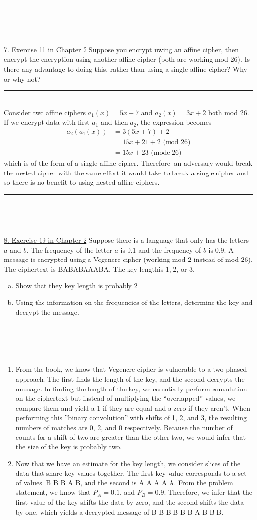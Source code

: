 \documentclass{article}
\newcommand{\problemsep}{\leavevmode\\[0.05in] \rule[\baselineskip/4]{\textwidth}{1pt} \\[0.005in] \rule[\baselineskip]{\textwidth}{1pt}\vspace{-\baselineskip}\leavevmode\\[0.05in]}
\newcommand{\statementsep}{\leavevmode\\[0.005in] \rule[\baselineskip/4]{\textwidth}{0.4pt}\leavevmode\\[0.005in]}
\begin{document}
\problemsep
\noindent\underline{7. Exercise 11 in Chapter 2}
Suppose you encrypt uwing an affine cipher, then encrypt the encryption using another affine cipher (both are working mod 26). Is there any advantage to doing this, rather than using a single affine cipher? Why or why not?
\statementsep
Consider two affine ciphers $a_1(x) = 5x + 7$ and $a_2(x) = 3x + 2$ both mod 26. If we encrypt data with first $a_1$ and then $a_2$, the expression becomes
\begin{equation*}\begin{aligned}
a_2(a_1(x)) & = 3(5x + 7) + 2  \\
            & = 15x + 21 + 2 \text{ (mod 26)} \\
            & = 15x + 23 \text{ (mode 26)}
\end{aligned}\end{equation*}
which is of the form of a single affine cipher. Therefore, an adversary would break the nested cipher with the same effort it would take to break a single cipher and so there is no benefit to using nested affine ciphers.
\problemsep
\noindent\underline{8. Exercise 19 in Chapter 2}
Suppose there is a language that only has the letters $a$ and $b$. The frequency of the letter $a$ is 0.1 and the frequency of $b$ is 0.9. A message is encrypted using a Vegenere cipher (working mod 2 instead of mod 26). The ciphertext is BABABAAABA. The key lengthis 1, 2, or 3.
\begin{enumerate}[(a)]
	\item Show that they key length is probably 2
	\item Using the information on the frequencies of the letters, determine the key and decrypt the message.
\end{enumerate}
\statementsep
\begin{enumerate}
	\item From the book, we know that Vegenere cipher is vulnerable to a two-phased approach. The first finds the length of the key, and the second decrypts the message. In finding the length of the key, we essentially perform convolution on the ciphertext but instead of multiplying the ``overlapped'' values, we compare them and yield a 1 if they are equal and a zero if they aren't. When performing this ''binary convolution'' with shifts of 1, 2, and 3, the resulting numbers of matches are 0, 2, and 0 respectively. Because the number of counts for a shift of two are greater than the other two, we would infer that the size of the key is probably two.
	\item Now that we have an estimate for the key length, we consider slices of the data that share key values together. The first key value corresponds to a set of values: B B B A B, and the second is A A A A A. From the problem statement, we know that $P_A = 0.1$, and $P_B = 0.9$. Therefore, we infer that the first value of the key shifts the data by zero, and the second shifts the data by one, which yields a decrypted message of B B B B B B A B B B.
\end{enumerate}
\end{document}
